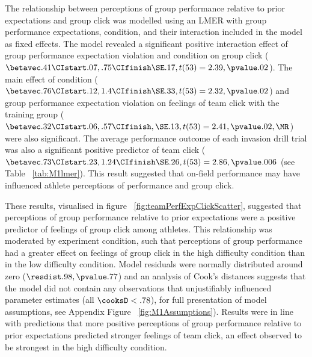 The relationship between perceptions of group performance relative to prior expectations and group click was modelled using an LMER with group performance expectations, condition, and their interaction included in the model as fixed effects. The model revealed a significant positive interaction effect of group performance expectation violation and condition on group click ($\betavec .41 \CIstart .07, .75 \CIfinish \SE .17, t(53) = 2.39, \pvalue .02 $).  The main effect of condition ($\betavec .76 \CIstart .12, 1.4 \CIfinish \SE .33, t(53) = 2.32, \pvalue .02 $) and group performance expectation violation on feelings of team click with the training group ($\betavec .32 \CIstart .06, .57 \CIfinish, \SE .13, t(53)= 2.41, \pvalue .02, \MR $) were also significant.  The average performance outcome of each invasion drill trial was also a significant positive predictor of team click ($\betavec .73 \CIstart .23, 1.24 \CIfinish \SE .26, t(53)= 2.86, \pvalue .006$ (see Table ~\ref{tab:M1lmer}). This result suggested that on-field performance may have influenced athlete perceptions of performance and group click.

These results, visualised in figure ~\ref{fig:teamPerfExpClickScatter}, suggested that perceptions of group performance relative to prior expectations were a positive predictor of feelings of group click among athletes.  This relationship was moderated by experiment condition, such that perceptions of group performance had a greater effect on feelings of group click in the high difficulty condition than in the low difficulty condition.  Model residuals were normally distributed around zero ($\resdist .98, \pvalue .77 $) and an analysis of Cook's distances suggests that the model did not contain any observations that unjustifiably influenced parameter estimates (all $\cooksD < .78$), for full presentation of model assumptions, see Appendix Figure ~\ref{fig:M1Assumptions}).  Results were in line with predictions that more positive perceptions of group performance relative to prior expectations predicted stronger feelings of team click, an effect observed to be strongest in the high difficulty condition.




